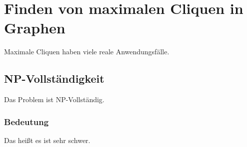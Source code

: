 \documentclass{scrartcl}
\begin{document}
	\section{Finden von maximalen Cliquen in Graphen}
	Maximale Cliquen haben viele reale Anwendungsfälle.
	\subsection{NP-Vollständigkeit}
	Das Problem ist NP-Vollständig.
	\subsubsection{Bedeutung}
	Das heißt es ist sehr schwer.
\end{document}
